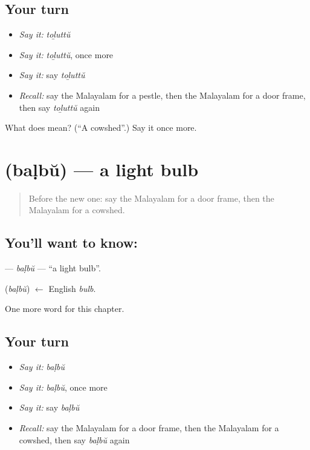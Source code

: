 \subsection*{Your turn}
\begin{itemize}
\raggedright
  \item \emph{Say it:} \emph{toḻuttŭ}
  \item \emph{Say it:} \emph{toḻuttŭ}, once more
  \item \emph{Say it:} say \emph{toḻuttŭ}
  \item \emph{Recall:} say the Malayalam for a pestle, then the Malayalam for a door frame, then say \emph{toḻuttŭ} again
\end{itemize}

\begin{tcolorbox}[breakable,colback=teal!4,colframe=teal!35!black,title={Before you move on}]
What does  mean? (\textquotedblleft{}A cowshed\textquotedblright{}.) Say it once more.
\end{tcolorbox}
\section[\texorpdfstring{\ml{ബൾബ്} (baḷbŭ)}{ബൾബ് (baḷbŭ)}]{ (baḷbŭ) — a light bulb}

\label{lesson:ML-C296-balbu}



\begin{quote}
Before the new one: say the Malayalam for a door frame, then the Malayalam for a cowshed.
\end{quote}

\subsection*{You'll want to know: }
\textbf{} — \emph{baḷbŭ} — \textquotedblleft{}a light bulb\textquotedblright{}.

\begin{cousinweb}
\textbf{} (\emph{baḷbŭ}) $\leftarrow$ English \emph{bulb}.
\end{cousinweb}

\begin{grammarlens}[title={What you've built}]
One more word for this chapter.
\end{grammarlens}

\subsection*{Your turn}
\begin{itemize}
\raggedright
  \item \emph{Say it:} \emph{baḷbŭ}
  \item \emph{Say it:} \emph{baḷbŭ}, once more
  \item \emph{Say it:} say \emph{baḷbŭ}
  \item \emph{Recall:} say the Malayalam for a door frame, then the Malayalam for a cowshed, then say \emph{baḷbŭ} again
\end{itemize}


